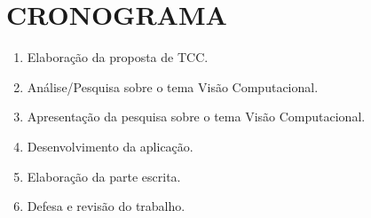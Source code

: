 
\chapter{CRONOGRAMA}

\begin{enumerate}
\item \label{1} Elaboração da proposta de TCC.
\item \label{2} Análise/Pesquisa sobre o tema Visão Computacional.
\item \label{3} Apresentação da pesquisa sobre o tema Visão Computacional.
\item \label{4} Desenvolvimento da aplicação. 
\item \label{5} Elaboração da parte escrita.
\item \label{6} Defesa e revisão do trabalho.
\end{enumerate}


